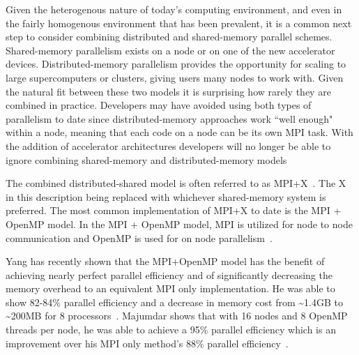 %
Given the heterogenous nature of today's computing environment, and even in the fairly homogenous environment that has been prevalent, it is a common next step to consider combining distributed and shared-memory parallel schemes.
%
Shared-memory parallelism exists on a node or on one of the new accelerator devices.
%
Distributed-memory parallelism provides the opportunity for scaling to large supercomputers or clusters, giving users many nodes to work with.
%
Given the natural fit between these two models it is surprising how rarely they are combined in practice.
%
Developers may have avoided using both types of parallelism to date since 
distributed-memory approaches work ``well enough" within a node, meaning
that each code on a node can be its own MPI task.
%
With the addition of accelerator architectures developers will no longer be able to ignore combining shared-memory and distributed-memory models
%

%
The combined distributed-shared model is often referred to as MPI+X~\cite{michaelwolfe2014}.
%
The X in this description being replaced with whichever shared-memory system is preferred.
%
The most common implementation of MPI+X to date is the MPI + OpenMP model.
%
In the MPI + OpenMP model, MPI is utilized for node to node communication and OpenMP is used for on node parallelism~\cite{michaelwolfe2014}.
%

%
Yang has recently shown that the MPI+OpenMP model has the benefit of achieving nearly perfect parallel efficiency and of significantly decreasing the memory overhead to an equivalent MPI only implementation.
%
He was able to show 82-84\% parallel efficiency and a decrease in memory cost from \textasciitilde1.4GB to \textasciitilde200MB for 8 processors~\cite{yanghybrid}.
%
Majumdar shows that with 16 nodes and 8 OpenMP threads per node, he was able to achieve a 95\% parallel efficiency which is an improvement over his MPI only method's 88\% parallel efficiency~\cite{majumdar2000parallel}. 
%
